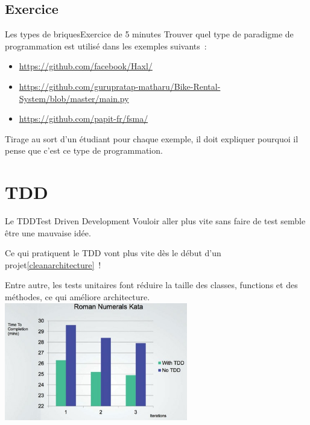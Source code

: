 \documentclass{beamer}
\begin{document}
    \subsection{Exercice}\label{subsec:briques-exe}
    \begin{frame}{Les types de briques}{Exercice \execcounterdispinc{} de 5 minutes}
        Trouver quel type de paradigme de programmation est utilisé dans les exemples suivants~:
        \begin{itemize}
            \item \url{https://github.com/facebook/Haxl/}
            \item \url{https://github.com/gurupratap-matharu/Bike-Rental-System/blob/master/main.py}
            \item \url{https://github.com/papit-fr/fsma/}
        \end{itemize}
        Tirage au sort d'un étudiant pour chaque exemple, il doit expliquer pourquoi il pense que c'est ce type de programmation.
    \end{frame}


    \section{TDD}

    \begin{frame}{Le TDD}{Test Driven Development}
        Vouloir aller plus vite sans faire de test semble être une mauvaise idée.

        Ce qui pratiquent le TDD vont plus vite dès le début d'un projet\cref{cleanarchitecture}~!

        Entre autre, les tests unitaires font réduire la taille des classes, functions et des méthodes, ce qui améliore architecture.
        \bigbreak
        \centering
        \includegraphics[width=8cm]{image/tdd-vs-no-tdd}
    \end{frame}
\end{document}

